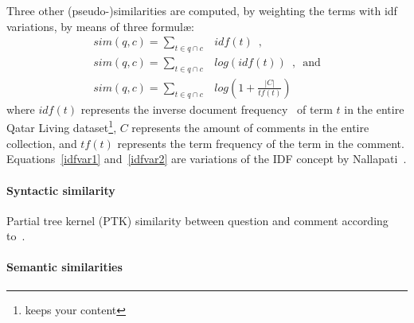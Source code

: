 Three other (pseudo-)similarities are computed, by weighting the terms with idf 
variations, by means of three formul\ae: 
%
\begin{eqnarray}
 sim(q, c)=\sum_{t\in q\cap c} & idf(t) \enspace,		\\
 sim(q, c)=\sum_{t\in q\cap c} & log(idf(t)) \enspace, \enspace \mathrm{and} 
\label{idfvar1}\\
 sim(q, c)=\sum_{t\in q\cap c} & log\left(1 + \frac{|C|}{tf(t)}\right) 
\label{idfvar2}
\end{eqnarray}
% 
where $idf(t)$ represents the inverse document frequency~\cite{Jones:1972} 
of term $t$ in the entire Qatar Living dataset\footnote{keeps your content}, 
$C$ represents the amount of comments in the entire collection, and $tf(t)$ 
represents the term frequency of the term in the comment. 
Equations~\ref{idfvar1} and~\ref{idfvar2} are variations of the IDF 
concept by Nallapati~.














\paragraph{Syntactic similarity}
\label{ssub:syntactic}

Partial tree kernel (PTK) similarity between question and comment according 
to~\cite{Moschitti:2006}. 

\paragraph{Semantic similarities}
\label{ssub:semantic}

